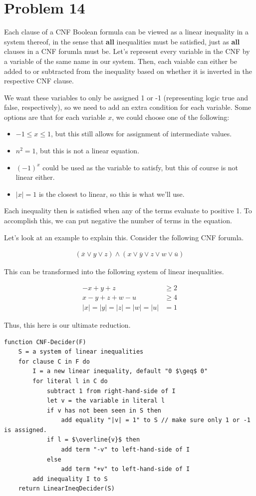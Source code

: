 \documentclass{article}
\providecommand{\prob}[1]{\section*{Problem #1}}
\begin{document}
\pagebreak
\prob{14}
Each clause of a CNF Boolean formula can be viewed as a linear inequality in a system thereof,
in the sense that \textbf{all} inequalities must be satisfied,
just as \textbf{all} clauses in a CNF forumla must be.
Let's represent every variable in the CNF by a variable of the same name in our system.
Then, each vaiable can either be added to or subtracted from the inequality based on whether it is inverted in the respective CNF clause.

We want these variables to only be assigned 1 or -1 (representing logic true and false, respectively), so we need to add an extra condition for each variable.
Some options are that for each variable $x$, we could choose one of the following:
\begin{itemize}
  \item $-1 \leq x \leq 1$, but this still allows for assignment of intermediate values.
  \item $n^2 = 1$, but this is not a linear equation.
  \item $(-1)^x$ could be used as the variable to satisfy, but this of course is not linear either.
  \item $|x| = 1$ is the closest to linear, so this is what we'll use.
\end{itemize}

Each inequality then is satisfied when any of the terms evaluate to positive 1.
To accomplish this, we can put negative the number of terms in the equation.

Let's look at an example to explain this.
Consider the following CNF forumla.

\begin{align*}
    (\overline{x} \lor y \lor z) \land (x \lor \overline{y} \lor z \lor w \lor \overline{u})
\end{align*}

This can be transformed into the following system of linear inequalities.

\begin{align*}
    -x + y + z &\geq 2\\
    x - y + z + w -u &\geq 4\\
    |x| = |y| = |z| = |w| = |u| &= 1
\end{align*}

Thus, this here is our ultimate reduction.

\begin{lstlisting}
function CNF-Decider(F)
    S = a system of linear inequalities
    for clause C in F do
        I = a new linear inequality, default "0 $\geq$ 0"
        for literal l in C do
            subtract 1 from right-hand-side of I
            let v = the variable in literal l
            if v has not been seen in S then
                add equality "|v| = 1" to S // make sure only 1 or -1 is assigned.
            if l = $\overline{v}$ then
                add term "-v" to left-hand-side of I
            else
                add term "+v" to left-hand-side of I
        add inequality I to S
    return LinearIneqDecider(S)
\end{lstlisting}
\end{document}
